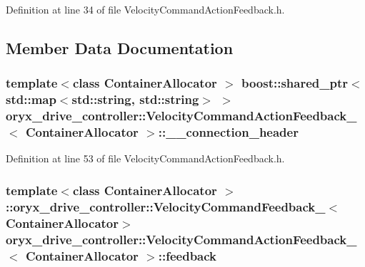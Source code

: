 \-Definition at line 34 of file \-Velocity\-Command\-Action\-Feedback.\-h.



\subsection{\-Member \-Data \-Documentation}
\subsubsection[{\-\_\-\-\_\-connection\-\_\-header}]{\setlength{\rightskip}{0pt plus 5cm}template$<$class Container\-Allocator $>$ boost\-::shared\-\_\-ptr$<$std\-::map$<$std\-::string, std\-::string$>$ $>$ {\bf oryx\-\_\-drive\-\_\-controller\-::\-Velocity\-Command\-Action\-Feedback\-\_\-}$<$ \-Container\-Allocator $>$\-::{\bf \-\_\-\-\_\-connection\-\_\-header}}\label{structoryx__drive__controller_1_1VelocityCommandActionFeedback___a4b3d54bcc3df99f73f8c234cef19f2f3}


\-Definition at line 53 of file \-Velocity\-Command\-Action\-Feedback.\-h.

\subsubsection[{feedback}]{\setlength{\rightskip}{0pt plus 5cm}template$<$class Container\-Allocator $>$ \-::{\bf oryx\-\_\-drive\-\_\-controller\-::\-Velocity\-Command\-Feedback\-\_\-}$<$\-Container\-Allocator$>$ {\bf oryx\-\_\-drive\-\_\-controller\-::\-Velocity\-Command\-Action\-Feedback\-\_\-}$<$ \-Container\-Allocator $>$\-::{\bf feedback}}\label{structoryx__drive__controller_1_1VelocityCommandActionFeedback___a2d5756af2529c60829f41edfa82e852c}


